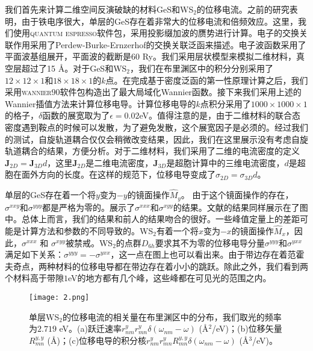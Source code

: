 我们首先来计算二维空间反演破缺的材料GeS和WS$_{2}$的位移电流。之前的研究表明，由于铁电序很大，单层的GeS存在着非常大的位移电流和倍频效应\cite{rangel_giant_2016,panday_strong_2017}。这里，我们使用\textsc{quantum espresso}软件包\cite{giannozzi_quantum_2009}，采用投影缀加波的赝势\cite{dal_corso_pseudopotentials_2014}进行计算。电子的交换关联作用采用了Perdew-Burke-Ernzerhof的交换关联泛函\cite{perdew_generalized_1996}来描述。电子波函数采用了平面波基组展开，平面波的截断是60 Ry。我们采用层状模型来模拟二维材料，真空层超过了15 \AA。对于GeS和WS$_2$，我们在布里渊区中的积分分别采用了 $12\times12\times1$和$18\times18\times1$的$k$点。在完成基于密度泛函的第一性原理计算之后，我们采用\textsc{wannier90}软件包\cite{mostofi_updated_2014}构造出了最大局域化Wannier函数。接下来我们采用上述的Wannier插值方法来计算位移电导。计算位移电导的$k$点积分采用了$1000\times1000\times1$的格子，$\delta$函数的展宽取为了$\epsilon = 0.02$eV。值得注意的是，由于二维材料的联合态密度遇到鞍点的时候可以发散，为了避免发散，这个展宽因子是必须的。经过我们的测试，自旋轨道耦合仅仅会稍微改变结果，因此，我们在这里展示没有考虑自旋轨道耦合的结果，方便分析。对于二维材料，我们采用了二维的电流密度的定义$\mathbf{J}_{2D}=\mathbf{J}_{3D}d$，这里$\mathbf{J}_{2D}$是二维电流密度，$\mathbf{J}_{3D}$是超胞计算中的三维电流密度，$d$是超胞在面外方向的长度。在这样的规范下，位移电导变成了$\sigma_{2D}=\sigma_{3D}d$。


单层的GeS存在着一个将$y$变为$-y$的镜面操作$\hat{M}_{y}$。 由于这个镜面操作的存在，$\sigma^{xxy}$和$\sigma^{yyy}$都是严格为零的。展示了$\sigma^{xxx}$和$\sigma^{xyy}$的结果。文献的结果同样展示在了图中。总体上而言，我们的结果和前人的结果吻合的很好。一些峰值定量上的差距可能是计算方法和参数的不同导致的。WS$_2$有着一个将$x$变为$-x$的镜面操作$\hat{M}_{x}$，因此，$\sigma^{xxx}$ 和 $\sigma^{xyy}$被禁戒。WS$_2$的点群$D_{6h}$要求其不为零的位移电导分量$\sigma^{yyy}$和$\sigma^{yxx}$满足如下关系：$\sigma^{yyy}=-\sigma^{yxx}$，这一点在图上也可以看出来。由于带边存在着范霍夫奇点，两种材料的位移电导都在带边存在着小小的跳跃。除此之外，我们看到两个材料高于带隙$1$eV的地方都有几个峰，这些峰都在可见光的范围之内。

\begin{figure}
	\begin{centering}
	\texttt{[image: 2.png]}
	\par\end{centering}
	\caption{\label{fig2} 单层WS$_{2}$的位移电流的相关量在布里渊区中的分布，我们取光的频率为$2.719$ eV。(a)跃迁速率$r_{nm}^{y}r_{mn}^{y}\delta(\omega_{nm}-\omega)$ (\AA$^{2}$/eV)；(b)位移矢量$R_{mn}^{y,y}$ (\AA)；(c)位移电导的积分核$r_{nm}^{y}r_{mn}^{y}R_{mn}^{y,y}\delta(\omega_{nm}-\omega)$ (\AA$^{3}$/eV)。}
\end{figure}

